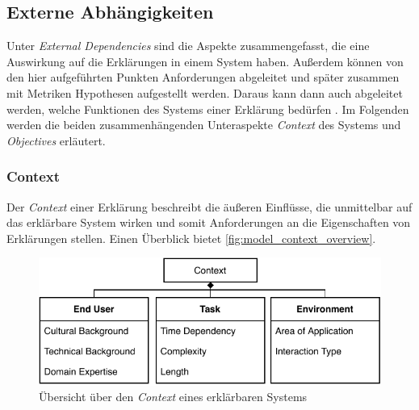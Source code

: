 \subsection{Externe Abhängigkeiten}
\label{sec:model_external_dependencies}

Unter \textit{External Dependencies} sind die Aspekte zusammengefasst, die eine Auswirkung auf die Erklärungen in einem System haben. Außerdem können von den hier aufgeführten Punkten Anforderungen abgeleitet und später zusammen mit Metriken Hypothesen aufgestellt werden. Daraus kann dann auch abgeleitet werden, welche Funktionen des Systems einer Erklärung bedürfen \cite{kohl_explainability_2019}. Im Folgenden werden die beiden zusammenhängenden Unteraspekte \textit{Context} des Systems und \textit{Objectives} erläutert.

\subsubsection{Context}

Der \textit{Context} einer Erklärung beschreibt die äußeren Einflüsse, die unmittelbar auf das erklärbare System wirken und somit Anforderungen an die Eigenschaften von Erklärungen stellen. Einen Überblick bietet \autoref{fig:model_context_overview}.

\begin{figure}[htb!]
    \begin{center}
        \includegraphics{contents/05_model_description/res/model_context_overview.pdf}
    \end{center}
    \caption{Übersicht über den \textit{Context} eines erklärbaren Systems}
    \label{fig:model_context_overview}
\end{figure}


